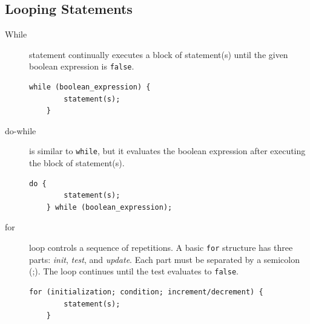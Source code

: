 \documentclass[11pt,a4paper]{article}
\begin{document}
\subsection*{Looping Statements}
\begin{description}
\item [While] statement continually executes a block of statement(s) until the given boolean expression is \lstinline!false!.
\begin{lstlisting}[numbers=none]
    while (boolean_expression) {
        statement(s);
    }
\end{lstlisting}

\item [do-while ] is similar to \lstinline!while!, but it evaluates the boolean expression after executing the block of statement(s).
\begin{lstlisting}[numbers=none]
    do {
        statement(s);
    } while (boolean_expression);
\end{lstlisting}

\item [for ] loop controls a sequence of repetitions. A basic \lstinline!for! structure has three parts: \emph{init}, \emph{test}, and \emph{update}. Each part must be separated by a semicolon (;). The loop continues until the test evaluates to \lstinline!false!. 
\begin{lstlisting}[numbers=none]
    for (initialization; condition; increment/decrement) {
        statement(s);
    } 
\end{lstlisting}

\end{description}
\vfill{\ }
\end{document}
